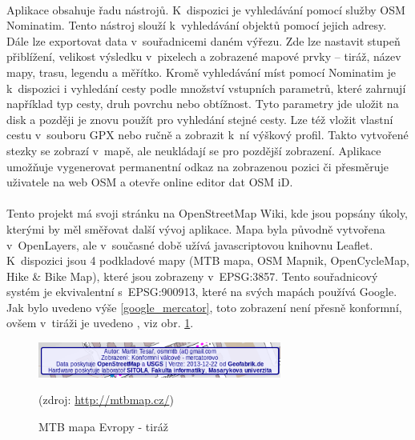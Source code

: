 \documentclass[11pt,a4paper,titlepage,oneside]{book}
\begin{document}
		\paragraph{} Aplikace obsahuje řadu nástrojů. K~dispozici je vyhledávání pomocí služby \ac{OSM} Nominatim\cite{nominatim}. Tento nástroj slouží k~vyhledávání objektů pomocí jejich adresy. Dále lze exportovat data v~souřadnicemi daném výřezu. Zde lze nastavit stupeň přiblížení, velikost výsledku v~pixelech a zobrazené mapové prvky -- tiráž, název mapy, trasu, legendu a měřítko. Kromě vyhledávání míst  pomocí Nominatim je k~dispozici i vyhledání cesty podle množství vstupních parametrů, které zahrnují například typ cesty, druh povrchu nebo obtížnost. Tyto parametry jde uložit na disk a později je znovu použít pro vyhledání stejné cesty. Lze též vložit vlastní cestu v~souboru \ac{GPX} nebo ručně a zobrazit k~ní výškový profil. Takto vytvořené stezky se zobrazí v~mapě, ale neukládají se pro pozdější zobrazení. Aplikace umožňuje vygenerovat permanentní odkaz na zobrazenou pozici či přesměruje uživatele na web \acl{OSM} a otevře online editor dat \ac{OSM} iD.


		\paragraph{} Tento projekt má svoji stránku na OpenStreetMap Wiki, kde jsou popsány úkoly, kterými by měl směřovat další vývoj aplikace. Mapa byla původně vytvořena v~OpenLayers\cite{tesar_bp}, ale v~současné době užívá javascriptovou knihovnu Leaflet. K~dispozici jsou 4 podkladové mapy (MTB mapa, OSM Mapnik, OpenCycleMap, Hike \& Bike Map), které jsou zobrazeny v~EPSG:3857. Tento souřadnicový systém je ekvivalentní s~EPSG:900913, které na svých mapách používá Google. Jak bylo uvedeno výše \ref{google_mercator}, toto zobrazení není přesně konformní, ovšem v~tiráži je uvedeno , viz obr. \ref{fig:MTB_tiraz}.
		\begin{figure}[!h]
			\begin{center}
				\includegraphics[width=8cm]{obrazky/tiraz.png}
				\caption{MTB mapa Evropy - tiráž}
				(zdroj: \url{http://mtbmap.cz/})
				\label{fig:MTB_tiraz}
			\end{center}
		\end{figure}
\end{document}
